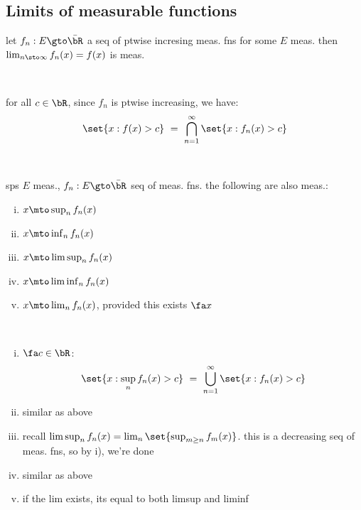 \subsection{Limits of measurable functions}

\begin{prop}
	let $f_{n}:E\gto\bar{\bR}$ a seq of ptwise incresing meas. fns for some
	$E$ meas.
	then $\lim_{n\sto\infty}f_{n}(x)=f(x)$ is meas.
\end{prop} \

\begin{pf}
	for all $c\in\bR$, since $f_{n}$ is ptwise increasing, we have:
	\begin{equation*}
		\set{x:f(x)>c} \ = \ \bigcap_{n=1}^{\infty}\set{x:f_{n}(x)>c}
	\end{equation*}
\end{pf} \

\begin{thm}
	sps $E$ meas., $f_{n}:E\gto\bar{\bR}$ seq of meas. fns.
	the following are also meas.:
	\begin{enumerate}[i)]
		\item $x\mto\sup_{n}f_{n}(x)$
		\item $x\mto\inf_{n}f_{n}(x)$
		\item $x\mto\limsup_{n}f_{n}(x)$
		\item $x\mto\liminf_{n}f_{n}(x)$
		\item $x\mto\lim_{n}f_{n}(x)$, provided this exists $\fa x$
	\end{enumerate}
\end{thm} \

\begin{pf}\vspace{-0.2in}
	\begin{enumerate}[i)]
		\item $\fa c\in\bR$:
			\begin{equation*}
				\set{x:\sup_{n}f_{n}(x)>c} \ = \ \bigcup_{n=1}^{\infty}\set{x:f_{n}(x)>c}
			\end{equation*}
		\item similar as above
		\item recall $\limsup_{n}f_{n}(x)=\lim_{n}\set{\sup_{m\geq n}f_{m}(x)}$.
			this is a decreasing seq of meas. fns, so by i), we're done
		\item similar as above
		\item if the lim exists, its equal to both limsup and liminf
	\end{enumerate}
\end{pf}

